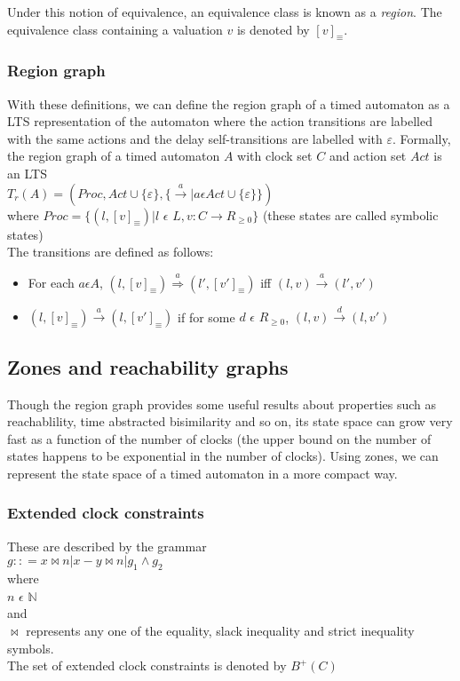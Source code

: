 \documentclass{article}
\begin{document}
Under this notion of equivalence, an equivalence class is known
as a \emph{region}. The equivalence class containing a valuation $v$
is denoted by $[v]_{\equiv}$.

\subsubsection{Region graph}
With these definitions, we can define the
region graph of a timed automaton as a LTS representation of the
automaton where the action transitions are labelled with the same
actions and the delay self-transitions are labelled with
$\varepsilon$.
Formally, the region graph of a timed automaton $A$ with clock set $C$
and action set $Act$ is an LTS\\
$T_r(A) = (Proc,Act \cup \{\varepsilon\}, \{\xrightarrow{a}|a \epsilon
Act \cup \{\varepsilon\}\})$\\
where $Proc = \{(l, [v]_{\equiv}) | l$ $\epsilon$ $L, v: C \rightarrow
R_{\ge 0}\}$ (these states are called symbolic states)\\
The transitions are defined as follows:
\begin{itemize}
\item For each $a \epsilon A$, $(l, [v]_{\equiv})
  \overset{a}{\Rightarrow} (l', [v']_{\equiv})$ iff $(l,v)
  \overset{a}{\rightarrow} (l', v')$
\item $(l, [v]_{\equiv}) \xrightarrow{a} (l, [v']_{\equiv})$ if
  for some $d$ $\epsilon$ $R_{\ge 0}$, $(l, v) \xrightarrow{d} (l,
  v')$
\end{itemize}

\subsection{Zones and reachability graphs}

Though the region graph provides some useful results about properties
such as reachablility, time
abstracted bisimilarity and so on, its state space can grow very fast as a
function of the number of clocks (the upper bound on the number of
states happens to be exponential in the number of clocks). Using
zones, we can represent the state space of a timed automaton in a more
compact way.

\subsubsection{Extended clock constraints}
These are described by the  grammar\\
$g :: = x \bowtie n | x - y \bowtie n | g_1 \wedge g_2$\\
where\\
$n$ $\epsilon$ $\mathbb{N}$\\
and\\
$\bowtie$ represents any one of the equality, slack inequality and
strict inequality symbols.\\
The set of extended clock constraints is denoted by $B^+(C)$
\end{document}
